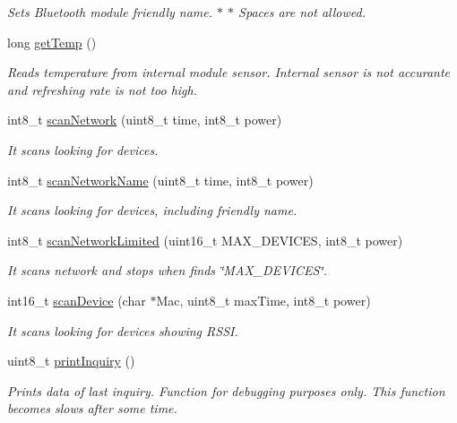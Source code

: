\begin{DoxyCompactItemize}
\begin{DoxyCompactList}\small\item\em Sets Bluetooth module friendly name. $\ast$ $\ast$ Spaces are not allowed. \end{DoxyCompactList}\item 
long \hyperlink{class_wasp_b_t___pro_a7d3b313e676b8400bcf2f642436b0a47}{get\+Temp} ()
\begin{DoxyCompactList}\small\item\em Reads temperature from internal module sensor. Internal sensor is not accurante and refreshing rate is not too high. \end{DoxyCompactList}\item 
int8\+\_\+t \hyperlink{class_wasp_b_t___pro_a16da72ad19b43b765a52a0cfebde84b6}{scan\+Network} (uint8\+\_\+t time, int8\+\_\+t power)
\begin{DoxyCompactList}\small\item\em It scans looking for devices. \end{DoxyCompactList}\item 
int8\+\_\+t \hyperlink{class_wasp_b_t___pro_a5ea1228e074289071dce0a2e78f919b6}{scan\+Network\+Name} (uint8\+\_\+t time, int8\+\_\+t power)
\begin{DoxyCompactList}\small\item\em It scans looking for devices, including friendly name. \end{DoxyCompactList}\item 
int8\+\_\+t \hyperlink{class_wasp_b_t___pro_a8d26875acfe796ed883e2b23b15f21eb}{scan\+Network\+Limited} (uint16\+\_\+t M\+A\+X\+\_\+\+D\+E\+V\+I\+C\+ES, int8\+\_\+t power)
\begin{DoxyCompactList}\small\item\em It scans network and stops when finds \char`\"{}\+M\+A\+X\+\_\+\+D\+E\+V\+I\+C\+E\+S\char`\"{}. \end{DoxyCompactList}\item 
int16\+\_\+t \hyperlink{class_wasp_b_t___pro_ae9e76f22894c6a8f63faf92203509067}{scan\+Device} (char $\ast$Mac, uint8\+\_\+t max\+Time, int8\+\_\+t power)
\begin{DoxyCompactList}\small\item\em It scans looking for devices showing R\+S\+SI. \end{DoxyCompactList}\item 
uint8\+\_\+t \hyperlink{class_wasp_b_t___pro_ab5cd9f7b1c7c23d8f7de116b54fbf82e}{print\+Inquiry} ()
\begin{DoxyCompactList}\small\item\em Prints data of last inquiry. Function for debugging purposes only. This function becomes slows after some time. \end{DoxyCompactList}\item 

\end{DoxyCompactItemize}
